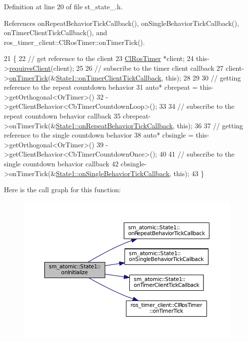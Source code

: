 Definition at line 20 of file st\+\_\+state\+\_.\+h.



References on\+Repeat\+Behavior\+Tick\+Callback(), on\+Single\+Behavior\+Tick\+Callback(), on\+Timer\+Client\+Tick\+Callback(), and ros\+\_\+timer\+\_\+client\+::\+Cl\+Ros\+Timer\+::on\+Timer\+Tick().


\begin{DoxyCode}
21     \{
22         \textcolor{comment}{// get reference to the client}
23         \hyperlink{classros__timer__client_1_1ClRosTimer}{ClRosTimer} *client;
24         this->\hyperlink{classsmacc_1_1ISmaccState_a7f95c9f0a6ea2d6f18d1aec0519de4ac}{requiresClient}(client);
25 
26         \textcolor{comment}{// subscribe to the timer client callback}
27         client->\hyperlink{classros__timer__client_1_1ClRosTimer_a06ecf6427b5df59f29879ab3bd1f120c}{onTimerTick}(&\hyperlink{structsm__atomic_1_1State1_adea28f0a0fcedb210a29656f53aeee09}{State1::onTimerClientTickCallback},
       \textcolor{keyword}{this});
28 
29 
30         \textcolor{comment}{// getting reference to the repeat countdown behavior}
31         \textcolor{keyword}{auto}* cbrepeat = this->getOrthogonal<OrTimer>()
32                               ->getClientBehavior<CbTimerCountdownLoop>();
33 
34         \textcolor{comment}{// subscribe to the repeat countdown behavior callback}
35         cbrepeat->onTimerTick(&\hyperlink{structsm__atomic_1_1State1_a9d2c943f02a8e0f1d7b86132ada1c6e0}{State1::onRepeatBehaviorTickCallback}, \textcolor{keyword}{
      this});
36 
37         \textcolor{comment}{// getting reference to the single countdown behavior}
38         \textcolor{keyword}{auto}* cbsingle = this->getOrthogonal<OrTimer>()
39                              ->getClientBehavior<CbTimerCountdownOnce>();
40 
41         \textcolor{comment}{// subscribe to the single countdown behavior callback}
42         cbsingle->onTimerTick(&\hyperlink{structsm__atomic_1_1State1_a9cb95d91cf5a22f0d9d079dc04bf58aa}{State1::onSingleBehaviorTickCallback}, \textcolor{keyword}{
      this});
43     \}
\end{DoxyCode}


Here is the call graph for this function\+:
\nopagebreak
\begin{figure}[H]
\begin{center}
\leavevmode
\includegraphics[width=350pt]{structsm__atomic_1_1State1_a13084492414b7b478f9f4b78a749c020_cgraph}
\end{center}
\end{figure}


